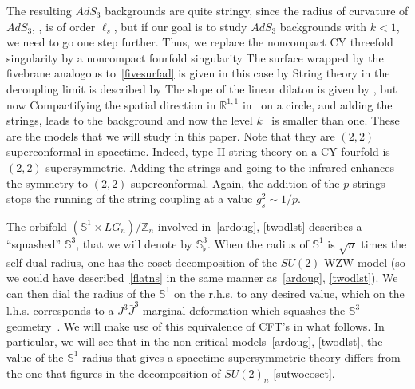 \documentclass[12pt]{article}
\def\sutwo{{SU(2)}}
\def\uone{U(1)}
\def\sqsphere{{\bS^3_\flat}}
\def\lstr{\ell_{\textit{s}}}
\newcommand{\bR}{{\mathbb R}}
\newcommand{\bS}{{\mathbb S}}
\newcommand{\bZ}{{\mathbb Z}}
\numberwithin{equation}{section}
\begin{document}
The resulting $AdS_3$ backgrounds are quite stringy, since the radius of curvature of $AdS_3$, \kval, is of order $\lstr$, but if our goal is to study $AdS_3$ backgrounds with $k<1$, we need to go one step further. Thus, we replace the noncompact CY threefold singularity by a noncompact fourfold singularity
The surface wrapped by the fivebrane analogous to~\eqref{fivesurfad} is given in this case by 
String theory in the decoupling limit is described by  
\eqn[twodlst]{R^{1,1}\times R_\phi\times \big(\bS^1\times LG_n\big)/\bZ_n ~.}
 The slope of the linear dilaton is given by \qqkk, but now 
Compactifying the spatial direction in $\bR^{1,1}$ in \twodlst\ on a circle, and adding the strings, leads to the background  
\eqn[klessone]{AdS_3\times \big(\bS^1\times LG_n\big)/\bZ_n ~,}
and now the level $k$ \kntwod\ is smaller than one. These are the models that we will study in this paper. Note that they are $(2,2)$ superconformal in spacetime. Indeed, type II string theory on a CY fourfold is $(2,2)$ supersymmetric. Adding the strings and going to the infrared enhances the symmetry to $(2,2)$ superconformal. 
Again, the addition of the $p$ strings stops the running of the string coupling at a value $g_s^2\sim 1/p$.

The orbifold $(\bS^1\times LG_n)/\bZ_n$ involved in~\eqref{ardoug}, \eqref{twodlst} describes a ``squashed'' $\bS^3$, that we will denote by $\sqsphere$.  When the radius of $\bS^1$ is $\sqrt{n}$ times the self-dual radius, one has the coset decomposition of the $\sutwo$ WZW model 
\eqn[sutwocoset]{
\sutwo_n = \left[\Big(\frac{\sutwo_n}{\uone}\Big)\times \uone\right]/\bZ_n
}
(so we could have described~\eqref{flatns} in the same manner as~\eqref{ardoug}, \eqref{twodlst}).  We can then dial the radius of the $\bS^1$ on the r.h.s. to any desired value, which on the l.h.s. corresponds to a $J^3\bar J^3$ marginal deformation which squashes the $\bS^3$ geometry~.  We will make use of this equivalence of CFT's in what follows. In particular, we will see that in the non-critical models~\eqref{ardoug}, \eqref{twodlst}, the value of the $\bS^1$ radius that gives a spacetime supersymmetric theory differs from the one that figures in the decomposition of $\sutwo_n$ \eqref{sutwocoset}.



\end{document}
